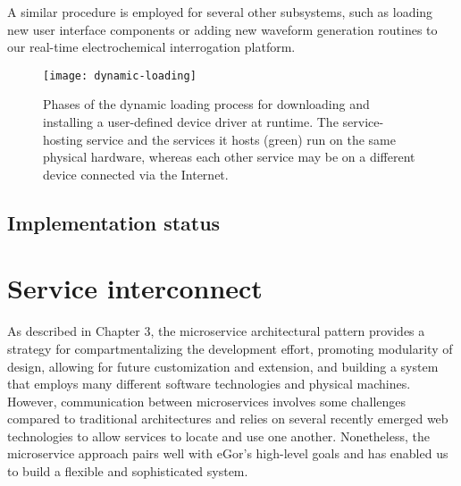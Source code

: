 \documentclass[../thesis]{subfiles}
\begin{document}
A similar procedure is employed for several other
subsystems, such as loading new user interface components or adding
new waveform generation routines to our real-time electrochemical
interrogation platform.

\begin{figure}
  \texttt{[image: dynamic-loading]}
  \caption{
    Phases of the dynamic loading process for downloading and
    installing a user-defined device driver at runtime. The
    service-hosting service and the services it hosts (green)
    run on the same physical hardware, whereas each other service may
    be on a different device connected via the Internet.
    \label{fig:DynamicLoading}
  }
\end{figure}

\subsection{Implementation status}



\section{Service interconnect}
As described in Chapter 3, the microservice architectural pattern
provides a strategy for compartmentalizing the development effort,
promoting modularity of design, allowing for future customization and
extension, and building a system that employs many different software
technologies and physical machines. However, communication between
microservices involves some challenges compared to traditional
architectures and relies on several recently emerged web technologies
to allow services to locate and use one another. Nonetheless,
the microservice approach pairs well with eGor's high-level goals and
has enabled us to build a flexible and sophisticated system.
\end{document}
